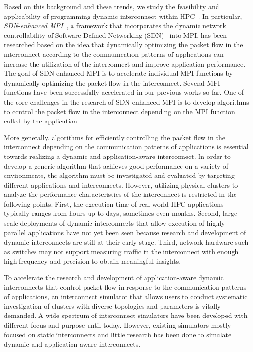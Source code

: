 Based on this background and these trends, we study the feasibility and
applicability of programming dynamic interconnect within
HPC~\autocite{Date2016}. In particular, \emph{SDN-enhanced
MPI}~\autocites{Takahashi2014}{Dashdavaa2013}, a framework that
incorporates the dynamic network controllability of Software-Defined
Networking (SDN)~\autocite{sdn} into MPI, has been researched based on
the idea that dynamically optimizing the packet flow in the interconnect
according to the communication patterns of applications can increase the
utilization of the interconnect and improve application performance. The
goal of SDN-enhanced MPI is to accelerate individual MPI functions by
dynamically optimizing the packet flow in the interconnect. Several MPI
functions have been successfully accelerated in our previous works so
far. One of the core challenges in the research of SDN-enhanced MPI is
to develop algorithms to control the packet flow in the interconnect
depending on the MPI function called by the application.

More generally, algorithms for efficiently controlling the packet flow
in the interconnect depending on the communication patterns of
applications is essential towards realizing a dynamic and
application-aware interconnect. In order to develop a generic algorithm
that achieves good performance on a variety of environments, the
algorithm must be investigated and evaluated by targeting different
applications and interconnects. However, utilizing physical clusters to
analyze the performance characteristics of the interconnect is
restricted in the following points. First, the execution time of
real-world HPC applications typically ranges from hours up to days,
sometimes even months. Second, large-scale deployments of dynamic
interconnects that allow execution of highly parallel applications have
not yet been seen because research and development of dynamic
interconnects are still at their early stage. Third, network hardware
such as switches may not support measuring traffic in the interconnect
with enough high frequency and precision to obtain meaningful insights.

To accelerate the research and development of application-aware dynamic
interconnects that control packet flow in response to the communication
patterns of applications, an interconnect simulator that allows users to
conduct systematic investigation of clusters with diverse topologies and
parameters is vitally demanded. A wide spectrum of interconnect
simulators have been developed with different focus and purpose until
today. However, existing simulators mostly focused on static
interconnects and little research has been done to simulate dynamic and
application-aware interconnects.

